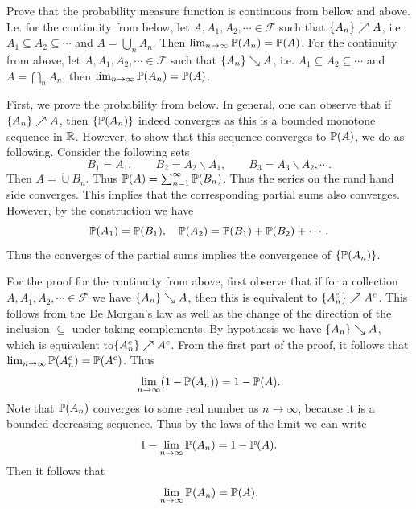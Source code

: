 \begin{problem}
	Prove that the probability measure function is continuous from bellow and above. I.e. for the continuity from below, let $ A, A_1, A_2,\cdots \in \mathcal{F} $ such that  $ \{A_n\}\nearrow A $, i.e. $ A_1 \subseteq A_2 \subseteq \cdots $ and $ A = \bigcup_n A_n $. Then $ \lim_{n\to \infty} \mathbb{P}(A_n) = \mathbb{P}(A) $. For the continuity from above, let $ A,A_1,A_2,\cdots \in \mathcal{F} $ such that $ \{A_n\}\searrow A $, i.e. $ A_1\subseteq A_2\subseteq \cdots $ and $ A = \bigcap_n A_n $, then $ \lim_{n\to \infty}\mathbb{P}(A_n) = \mathbb{P}(A) $.
\end{problem}
\begin{solution}
	First, we prove the probability from below. In general, one can observe that if $ \{A_n\}\nearrow A $, then $ \{\mathbb{P}(A_n)\} $ indeed converges as this is a bounded monotone sequence in $ \mathbb{R} $. However, to show that this sequence converges to $ \mathbb{P}(A) $, we do as following. Consider the following sets
	\[ B_1 = A_1, \qquad B_2 = A_2 \backslash A_1, \qquad B_3 = A_3 \backslash A_2, \cdots. \]
	Then $ A = \dot\cup B_n $. Thus $ \mathbb{P}(A) = \sum_{n=1}^{\infty}\mathbb{P}(B_n) $. Thus the series on the rand hand side converges. This implies that the corresponding partial sums also converges. However, by the construction we have
	\[ \mathbb{P}(A_1) = \mathbb{P}(B_1),\quad \mathbb{P}(A_2) = \mathbb{P}(B_1) + \mathbb{P}(B_2)+ \cdots. \]
	Thus the converges of the partial sums implies the convergence of $ \{\mathbb{P}(A_n)\} $.
	
	For the proof for the continuity from above, first observe that if for a collection $ A,A_1,A_2,\cdots \in \mathcal{F} $ we have $ \{A_n\} \searrow A $, then this is equivalent to $ \{A^c_n\}\nearrow A^c $. This follows from the De Morgan's law as well as the change of the direction of the inclusion $ \subseteq $ under taking complements. By hypothesis we have $ \{A_n\}\searrow A $, which is equivalent to$ \{A^c_n\}\nearrow A^c $. From the first part of the proof, it follows that $ \lim_{n\to \infty}\mathbb{P}(A^c_n) = \mathbb{P}(A^c) $. Thus
	\[ \lim_{n\to \infty}(1-\mathbb{P}(A_n)) = 1 - \mathbb{P}(A). \]
	Note that $ \mathbb{P}(A_n) $ converges to some real number as $ n\to \infty $, because it is a bounded decreasing sequence. Thus by the laws of the limit we can write
	\[1 -  \lim_{n\to\infty} \mathbb{P}(A_n) = 1 - \mathbb{P}(A). \]
	Then it follows that 
	\[ \lim_{n\to \infty}\mathbb{P}(A_n) = \mathbb{P}(A). \]
\end{solution}

